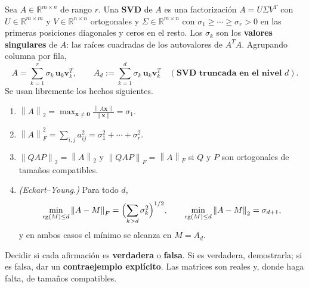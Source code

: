 \documentclass[11pt,a4paper]{article}
\newcommand{\R}{\mathbb{R}}
\newcommand{\bi}[1]{\boldsymbol{#1}}
\DeclareMathOperator{\rg}{rg}
\newcommand{\norm}[1]{\left\|#1\right\|}
\newcommand{\normF}[1]{\left\|#1\right\|_{F}}
\newcommand{\normdos}[1]{\left\|#1\right\|_{2}}
\begin{document}
\begin{manojo}
Sea $A\in\R^{m\times n}$ de rango $r$. Una \textbf{SVD} de $A$ es una
factorización $A=U\Sigma V^T$ con $U\in\R^{m\times m}$ y $V\in\R^{n\times n}$
ortogonales y $\Sigma\in\R^{m\times n}$ con $\sigma_1\ge\cdots\ge\sigma_r>0$
en las primeras posiciones diagonales y ceros en el resto. Los $\sigma_k$ son
los \textbf{valores singulares} de $A$: las raíces cuadradas de los
autovalores de $A^TA$. Agrupando columna por fila,
\[
A=\sum_{k=1}^{r}\sigma_k\,\bi u_k\bi v_k^T ,
\qquad
A_d:=\sum_{k=1}^{d}\sigma_k\,\bi u_k\bi v_k^T
\quad(\textbf{SVD truncada en el nivel } d).
\]
Se usan libremente los hechos siguientes.
\begin{enumerate}[label=\textup{(R\arabic*)},leftmargin=*,itemsep=2pt,topsep=3pt]
\item $\displaystyle\normdos{A}=\max_{\bi x\neq\bi0}\frac{\norm{A\bi x}}{\norm{\bi x}}=\sigma_1$.
\item $\normF{A}^2=\sum_{i,j}a_{ij}^2=\sigma_1^2+\cdots+\sigma_r^2$.
\item $\normdos{QAP}=\normdos{A}$ y $\normF{QAP}=\normF{A}$ si $Q$ y $P$ son
ortogonales de tamaños compatibles.
\item \emph{(Eckart--Young.)} Para todo $d$,
\[
\min_{\rg(M)\le d}\normF{A-M}=\Bigl(\sum_{k>d}\sigma_k^2\Bigr)^{1/2} ,
\qquad
\min_{\rg(M)\le d}\normdos{A-M}=\sigma_{d+1} ,
\]
y en ambos casos el mínimo se alcanza en $M=A_d$.
\end{enumerate}
\end{manojo}

\noindent
Decidir si cada afirmación es \textbf{verdadera} o \textbf{falsa}. Si es
verdadera, demostrarla; si es falsa, dar un \textbf{contraejemplo explícito}.
Las matrices son reales y, donde haga falta, de tamaños compatibles.
\end{document}
